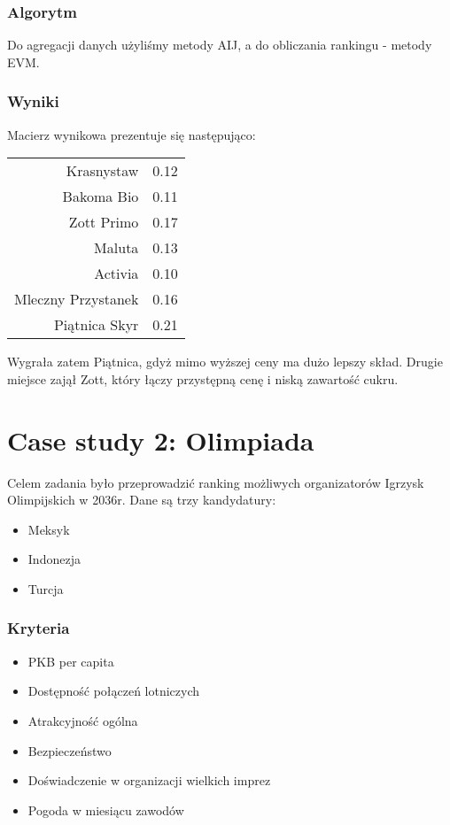 \documentclass[12pt, a4paper]{article}
\begin{document}
    \subsubsection*{Algorytm}
    Do agregacji danych użyliśmy metody AIJ, a do obliczania rankingu - metody EVM.

    \subsubsection*{Wyniki}
    Macierz wynikowa prezentuje się następująco:
    \begin{table}[h]
        \centering
        \begin{tabular}{rl}
            Krasnystaw & 0.12 \\
            Bakoma Bio & 0.11 \\ 
            Zott Primo & 0.17 \\ 
            Maluta     & 0.13 \\
            Activia    & 0.10 \\
            Mleczny Przystanek & 0.16 \\
            Piątnica Skyr & 0.21 \\
        \end{tabular}
    \end{table}

    Wygrała zatem Piątnica, gdyż mimo wyższej ceny ma dużo lepszy skład. Drugie miejsce zajął Zott, który łączy przystępną
    cenę i niską zawartość cukru.

    \pagebreak

    \section*{Case study 2: Olimpiada}
    Celem zadania było przeprowadzić ranking możliwych organizatorów Igrzysk Olimpijskich w 2036r.
    Dane są trzy kandydatury:
    \begin{itemize}
        \item Meksyk
        \item Indonezja
        \item Turcja
    \end{itemize}

    \subsubsection*{Kryteria}
    \begin{itemize}
        \item PKB per capita
        \item Dostępność połączeń lotniczych
        \item Atrakcyjność ogólna
        \item Bezpieczeństwo
        \item Doświadczenie w organizacji wielkich imprez
        \item Pogoda w miesiącu zawodów
    \end{itemize}
\end{document}
